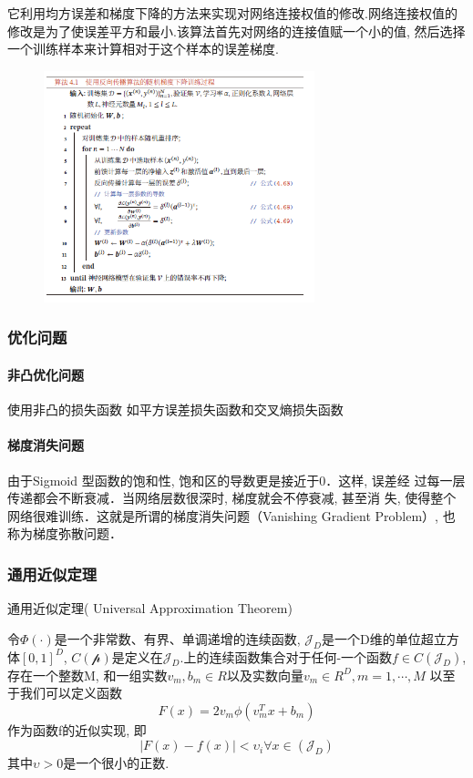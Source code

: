 \documentclass[a4paper]{article}
\begin{document}
它利用均方误差和梯度下降的方法来实现对网络连接权值的修改.网络连接权值的修改是为了使误差平方和最小.该算法首先对网络的连接值赋一个小的值, 然后选择一个训练样本来计算相对于这个样本的误差梯度.
\begin{figure}
    \centering
    \includegraphics[width=0.7\textwidth]{algorithm_bp.png}
\end{figure} 

\subsubsection{优化问题}
\paragraph{非凸优化问题}
使用非凸的损失函数
如平方误差损失函数和交叉熵损失函数
\paragraph{梯度消失问题}
由于Sigmoid 型函数的饱和性, 饱和区的导数更是接近于0．这样, 误差经
过每一层传递都会不断衰减．当网络层数很深时, 梯度就会不停衰减, 甚至消
失, 使得整个网络很难训练．这就是所谓的梯度消失问题（Vanishing Gradient
Problem）, 也称为梯度弥散问题．

\subsubsection{通用近似定理}
通用近似定理( Universal Approximation Theorem) 

令$\Phi(\cdot)$是一个非常数、有界、单调递增的连续函数,  $\mathcal{J}_D$是一个D维的单位超立方体$[0, 1]^D$,  $C(\mathcal{p})$是定义在$\mathcal{J}_D$.上的连续函数集合对于任何-一个函数$f \in C(\mathcal{J}_D)$, 存在一个整数M, 和一组实数$v_m, b_m \in R$以及实数向量$v_m \in R^D, m= 1,  \cdots,  M$ 以至于我们可以定义函数
$$F(x) =2v_m \phi(v_m^T x + b_m)$$
作为函数f的近似实现, 即
$$|F(x)- f(x)|< \upsilon_i \forall x \in (\mathcal{J}_D) $$
其中$ \upsilon > 0$是一个很小的正数.
\end{document}
